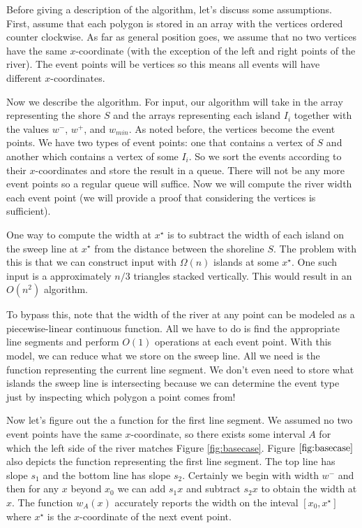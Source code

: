 \documentclass[11pt]{article}
\begin{document}
Before giving a description of the algorithm, let's discuss some assumptions.
First, assume that each polygon is stored in an array with the vertices ordered counter clockwise.
As far as general position goes, we assume that no two vertices have the same $x$-coordinate (with the exception of the left and right points of the river).
The event points will be vertices so this means all events will have different $x$-coordinates.

Now we describe the algorithm.
For input, our algorithm will take in the array representing the shore $S$ and the arrays representing each island $I_i$ together with the values $w^-$, $w^+$, and $w_{min}$.
As noted before, the vertices become the event points.
We have two types of event points: one that contains a vertex of $S$ and another which contains a vertex of some $I_i$.
So we sort the events according to their $x$-coordinates and store the result in a queue.
There will not be any more event points so a regular queue will suffice.
Now we will compute the river width each event point (we will provide a proof that considering the vertices is sufficient).

One way to compute the width at $x^\star$ is to subtract the width of each island on the sweep line at $x^\star$ from the distance between the shoreline $S$.
The problem with this is that we can construct input with $\Omega (n)$ islands at some $x^\star$.
One such input is a approximately $n/3$ triangles stacked vertically.
This would result in an $O(n^2)$ algorithm.

To bypass this, note that the width of the river at any point can be modeled as a piecewise-linear continuous function.
All we have to do is find the appropriate line segments and perform $O(1)$ operations at each event point.
With this model, we can reduce what we store on the sweep line.
All we need is the function representing the current line segment.
We don't even need to store what islands the sweep line is intersecting because we can determine the event type just by inspecting which polygon a point comes from!

Now let's figure out the a function for the first line segment.
We assumed no two event points have the same $x$-coordinate, so there exists some interval $A$ for which the left side of the river matches Figure \ref{fig:basecase}.
Figure $\ref{fig:basecase}$ also depicts the function representing the first line segment.
The top line has slope $s_1$ and the bottom line has slope $s_2$.
Certainly we begin with width $w^-$ and then for any $x$ beyond $x_0$ we can add $s_1 x$ and subtract $s_2 x$ to obtain the width at $x$.
The function $w_A (x)$ accurately reports the width on the inteval $[x_0, x^\star]$ where $x^\star$ is the $x$-coordinate of the next event point.
\end{document}
